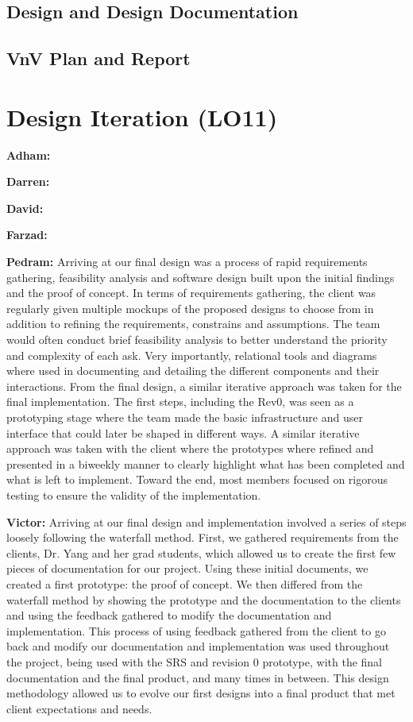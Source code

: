 \documentclass{article}
\begin{document}
\subsection{Design and Design Documentation}

\subsection{VnV Plan and Report}

\section{Design Iteration (LO11)}


\textbf{Adham:}

\textbf{Darren:}

\textbf{David:}

\textbf{Farzad:}

\textbf{Pedram:} Arriving at our final design was a process of rapid requirements gathering, feasibility analysis and software design built upon the initial findings and the proof of concept. In terms of requirements gathering, the client was regularly given multiple mockups of the proposed designs to choose from in addition to refining the requirements, constrains and assumptions. The team would often conduct brief feasibility analysis to better understand the priority and complexity of each ask. Very importantly, relational tools and diagrams where used in documenting and detailing the different components and their interactions.  From the final design, a similar iterative approach was taken for the final implementation. The first steps, including the Rev0, was seen as a prototyping stage where the team made the basic infrastructure and user interface that could later be shaped in different ways. A similar iterative approach was taken with the client where the prototypes where refined and presented in a biweekly manner to clearly highlight what has been completed and what is left to implement. Toward the end, most members focused on rigorous testing to ensure the validity of the implementation. 

\textbf{Victor:} Arriving at our final design and implementation involved a series of steps loosely following the waterfall method. First, we gathered requirements from the clients, Dr. Yang and her grad students, which allowed us to create the first few pieces of documentation for our project. Using these initial documents, we created a first prototype: the proof of concept. We then differed from the waterfall method by showing the prototype and the documentation to the clients and using the feedback gathered to modify the documentation and implementation. This process of using feedback gathered from the client to go back and modify our documentation and implementation was used throughout the project, being used with the SRS and revision 0 prototype, with the final documentation and the final product, and many times in between. This design methodology allowed us to evolve our first designs into a final product that met client expectations and needs.
\end{document}
